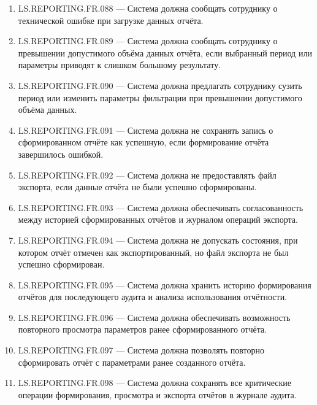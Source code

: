 \documentclass[12pt,a4paper]{article}
\begin{document}
\begin{enumerate}
		\item LS.REPORTING.FR.088 --- Система должна сообщать сотруднику о технической
		ошибке при загрузке данных отчёта.
		
		\item LS.REPORTING.FR.089 --- Система должна сообщать сотруднику о превышении
		допустимого объёма данных отчёта, если выбранный период или параметры приводят
		к слишком большому результату.
		
		\item LS.REPORTING.FR.090 --- Система должна предлагать сотруднику сузить период
		или изменить параметры фильтрации при превышении допустимого объёма данных.
		
		\item LS.REPORTING.FR.091 --- Система должна не сохранять запись о сформированном
		отчёте как успешную, если формирование отчёта завершилось ошибкой.
		
		\item LS.REPORTING.FR.092 --- Система должна не предоставлять файл экспорта, если
		данные отчёта не были успешно сформированы.
		
		\item LS.REPORTING.FR.093 --- Система должна обеспечивать согласованность между
		историей сформированных отчётов и журналом операций экспорта.
		
		\item LS.REPORTING.FR.094 --- Система должна не допускать состояния, при котором
		отчёт отмечен как экспортированный, но файл экспорта не был успешно сформирован.
		
		\item LS.REPORTING.FR.095 --- Система должна хранить историю формирования отчётов
		для последующего аудита и анализа использования отчётности.
		
		\item LS.REPORTING.FR.096 --- Система должна обеспечивать возможность повторного
		просмотра параметров ранее сформированного отчёта.
		
		\item LS.REPORTING.FR.097 --- Система должна позволять повторно сформировать отчёт
		с параметрами ранее созданного отчёта.
		
		\item LS.REPORTING.FR.098 --- Система должна сохранять все критические операции
		формирования, просмотра и экспорта отчётов в журнале аудита.
	\end{enumerate}
	
	
	
\end{document}
